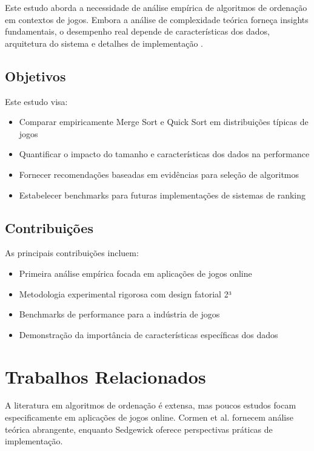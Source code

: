 \documentclass[conference]{IEEEtran}
\begin{document}
Este estudo aborda a necessidade de análise empírica de algoritmos de ordenação em contextos de jogos. Embora a análise de complexidade teórica forneça insights fundamentais, o desempenho real depende de características dos dados, arquitetura do sistema e detalhes de implementação \cite{knuth_sorting_2021}.

\subsection{Objetivos}

Este estudo visa:
\begin{itemize}
\item Comparar empiricamente Merge Sort e Quick Sort em distribuições típicas de jogos
\item Quantificar o impacto do tamanho e características dos dados na performance
\item Fornecer recomendações baseadas em evidências para seleção de algoritmos
\item Estabelecer benchmarks para futuras implementações de sistemas de ranking
\end{itemize}

\subsection{Contribuições}

As principais contribuições incluem:
\begin{itemize}
\item Primeira análise empírica focada em aplicações de jogos online
\item Metodologia experimental rigorosa com design fatorial 2³
\item Benchmarks de performance para a indústria de jogos
\item Demonstração da importância de características específicas dos dados
\end{itemize}

\section{Trabalhos Relacionados}

A literatura em algoritmos de ordenação é extensa, mas poucos estudos focam especificamente em aplicações de jogos online. Cormen et al. \cite{cormen_algorithms_2022} fornecem análise teórica abrangente, enquanto Sedgewick \cite{sedgewick_algorithms_2020} oferece perspectivas práticas de implementação.
\end{document}
